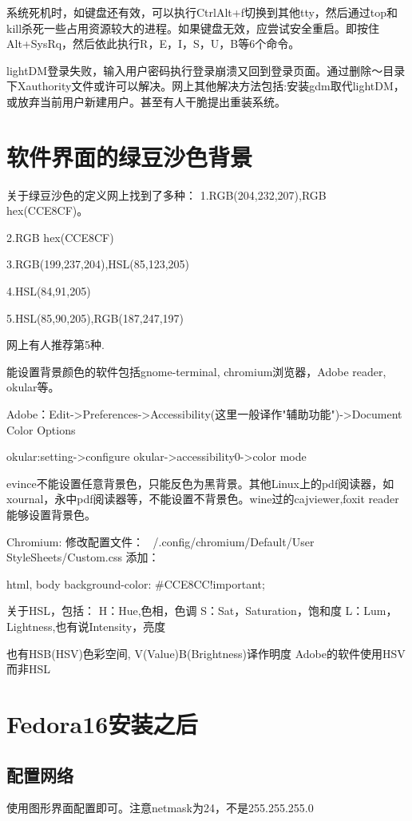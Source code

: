 系统死机时，如键盘还有效，可以执行CtrlAlt+f切换到其他tty，然后通过top和kill杀死一些占用资源较大的进程。如果键盘无效，应尝试安全重启。即按住Alt+SysRq，然后依此执行R，E，I，S，U，B等6个命令。

lightDM登录失败，输入用户密码执行登录崩溃又回到登录页面。通过删除～目录下Xauthority文件或许可以解决。网上其他解决方法包括:安装gdm取代lightDM，或放弃当前用户新建用户。甚至有人干脆提出重装系统。
\section{软件界面的绿豆沙色背景}
关于绿豆沙色的定义网上找到了多种：
1.RGB(204,232,207),RGB hex(CCE8CF)。

2.RGB hex(CCE8CF)

3.RGB(199,237,204),HSL(85,123,205)

4.HSL(84,91,205)

5.HSL(85,90,205),RGB(187,247,197)

网上有人推荐第5种.

能设置背景颜色的软件包括gnome-terminal, chromium浏览器，Adobe reader, okular等。


Adobe：Edit->Preferences->Accessibility(这里一般译作"辅助功能")->Document Color Options

okular:setting->configure okular->accessibility0->color mode

evince不能设置任意背景色，只能反色为黑背景。其他Linux上的pdf阅读器，如xournal，永中pdf阅读器等，不能设置不背景色。wine过的cajviewer,foxit reader能够设置背景色。



Chromium:
修改配置文件：
~/.config/chromium/Default/User StyleSheets/Custom.css
添加：
\begin{shellcmd}
html, body {background-color: #CCE8CC!important;}
\end{shellcmd}



关于HSL，包括：
H：Hue,色相，色调
S：Sat，Saturation，饱和度
L：Lum，Lightness,也有说Intensity，亮度

也有HSB(HSV)色彩空间,
V(Value)B(Brightness)译作明度
Adobe的软件使用HSV而非HSL
\newpage
\section{Fedora16安装之后}
\subsection{配置网络}
使用图形界面配置即可。注意netmask为24，不是255.255.255.0
